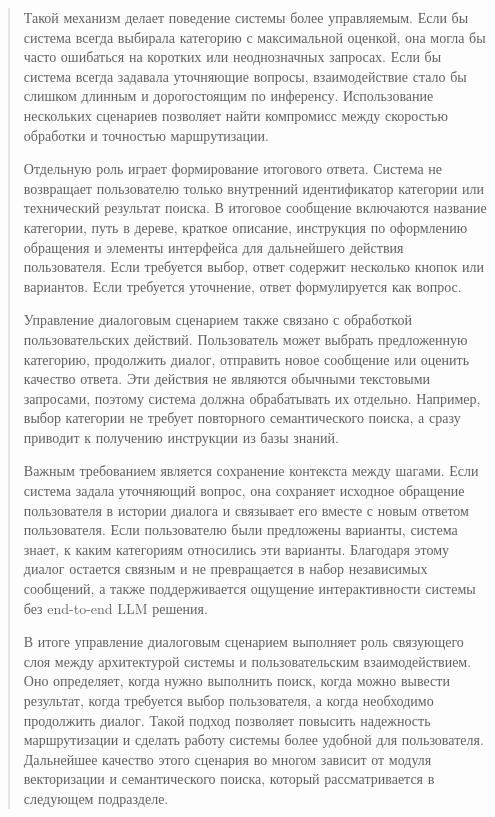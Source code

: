 \begin{quote}
Такой механизм делает поведение системы более управляемым. Если бы
система всегда выбирала категорию с максимальной оценкой, она могла бы
часто ошибаться на коротких или неоднозначных запросах. Если бы система
всегда задавала уточняющие вопросы, взаимодействие стало бы слишком
длинным и дорогостоящим по инференсу. Использование нескольких сценариев
позволяет найти компромисс между скоростью обработки и точностью
маршрутизации.

Отдельную роль играет формирование итогового ответа. Система не
возвращает пользователю только внутренний идентификатор категории или
технический результат поиска. В итоговое сообщение включаются название
категории, путь в дереве, краткое описание, инструкция по оформлению
обращения и элементы интерфейса для дальнейшего действия пользователя.
Если требуется выбор, ответ содержит несколько кнопок или вариантов.
Если требуется уточнение, ответ формулируется как вопрос.

Управление диалоговым сценарием также связано с обработкой
пользовательских действий. Пользователь может выбрать предложенную
категорию, продолжить диалог, отправить новое сообщение или оценить
качество ответа. Эти действия не являются обычными текстовыми запросами,
поэтому система должна обрабатывать их отдельно. Например, выбор
категории не требует повторного семантического поиска, а сразу приводит
к получению инструкции из базы знаний.

Важным требованием является сохранение контекста между шагами. Если
система задала уточняющий вопрос, она сохраняет исходное обращение
пользователя в истории диалога и связывает его вместе с новым ответом
пользователя. Если пользователю были предложены варианты, система знает,
к каким категориям относились эти варианты. Благодаря этому диалог
остается связным и не превращается в набор независимых сообщений, а
также поддерживается ощущение интерактивности системы без end-to-end LLM
решения.

В итоге управление диалоговым сценарием выполняет роль связующего слоя
между архитектурой системы и пользовательским взаимодействием. Оно
определяет, когда нужно выполнить поиск, когда можно вывести результат,
когда требуется выбор пользователя, а когда необходимо продолжить
диалог. Такой подход позволяет повысить надежность маршрутизации и
сделать работу системы более удобной для пользователя. Дальнейшее
качество этого сценария во многом зависит от модуля векторизации и
семантического поиска, который рассматривается в следующем подразделе.
\end{quote}

